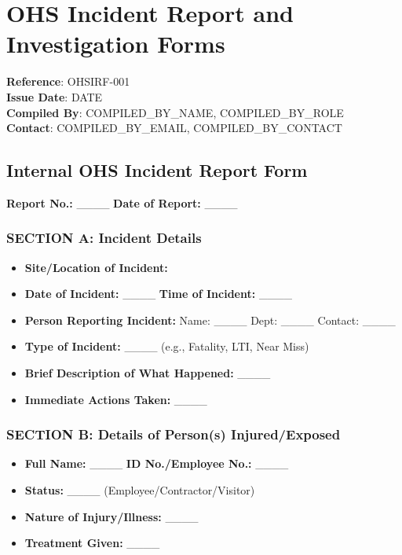 \documentclass[11pt]{article}
\newcommand{\docTitle}{OHS Incident Report and Investigation Forms}
\newcommand{\refNumber}{OHSIRF-001}
\newcommand{\issueDate}{{{DATE}}}
\newcommand{\location}{}
\newcommand{\compilerName}{{{COMPILED_BY_NAME}}}
\newcommand{\compilerRole}{{{COMPILED_BY_ROLE}}}
\newcommand{\compilerEmail}{{{COMPILED_BY_EMAIL}}}
\newcommand{\compilerPhone}{{{COMPILED_BY_CONTACT}}}
\begin{document}
\section*{\docTitle}
\textbf{Reference}: \refNumber \\
\textbf{Issue Date}: \issueDate \\
\textbf{Compiled By}: \compilerName, \compilerRole \\
\textbf{Contact}: \compilerEmail, \compilerPhone

\subsection*{Internal OHS Incident Report Form}

\textbf{Report No.:} \_\_\_\_ \textbf{Date of Report:} \_\_\_\_

\subsubsection*{SECTION A: Incident Details}
\begin{itemize}
    \item \textbf{Site/Location of Incident:} \location
    \item \textbf{Date of Incident:} \_\_\_\_ \textbf{Time of Incident:} \_\_\_\_
    \item \textbf{Person Reporting Incident:} Name: \_\_\_\_ Dept: \_\_\_\_ Contact: \_\_\_\_
    \item \textbf{Type of Incident:} \_\_\_\_ (e.g., Fatality, LTI, Near Miss)
    \item \textbf{Brief Description of What Happened:} \_\_\_\_
    \item \textbf{Immediate Actions Taken:} \_\_\_\_
\end{itemize}

\subsubsection*{SECTION B: Details of Person(s) Injured/Exposed}
\begin{itemize}
    \item \textbf{Full Name:} \_\_\_\_ \textbf{ID No./Employee No.:} \_\_\_\_
    \item \textbf{Status:} \_\_\_\_ (Employee/Contractor/Visitor)
    \item \textbf{Nature of Injury/Illness:} \_\_\_\_
    \item \textbf{Treatment Given:} \_\_\_\_
\end{itemize}
\end{document}
